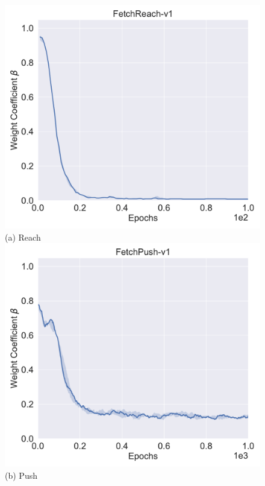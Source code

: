 \begin{figure}[h!]
\centering
{}
  \centering
  \includegraphics[width=\linewidth]{figures/chapter3/reach_samples.pdf}
  ({a}) Reach
\endminipage
{}%
  \centering
  \includegraphics[width=\linewidth]{figures/chapter3/push_samples.pdf}
  ({b}) Push
\endminipage\hfill
{}%
  \centering

\end{figure}
